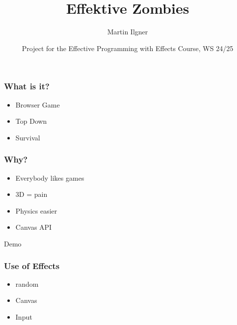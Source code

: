 \documentclass{beamer}
\title{Effektive Zombies}
\author{Martin Ilgner}
\institute{University of Tübingen}
\date{Project for the Effective Programming with Effects Course, WS 24/25}
\begin{document}
	
	\frame{\titlepage}
	
	\begin{frame}
		\frametitle{What is it?}
		\begin{itemize}
			\item Browser Game
			\item Top Down 
			\item Survival
		\end{itemize}
	\end{frame}
	
	\begin{frame}
		\frametitle{Why?}
		\begin{itemize}
			\item<2-> Everybody likes games
			\item<3-> 3D = pain
			\item<4-> Physics easier %
			\item<5-> Canvas API
		\end{itemize}
	\end{frame}
	
	\begin{frame}[plain, c]
		\begin{center}
			\Huge Demo
		\end{center}
	\end{frame}
	
	\begin{frame}
		\frametitle{Use of Effects}
		\begin{itemize}
			\item random
			\item Canvas
			\item Input
		\end{itemize}
	\end{frame}
	
\end{document}
